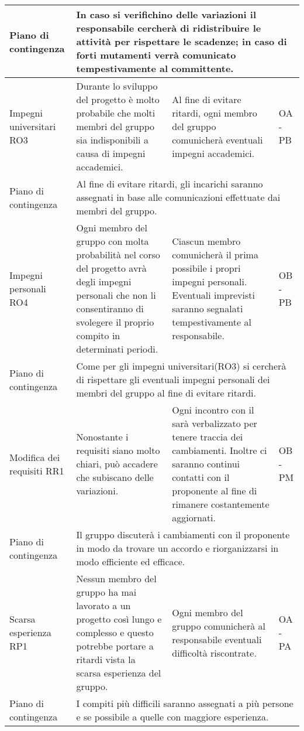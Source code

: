 \begin{center}
\begin{longtable}{|p{}|p{}|p{}|p{}|}
		\hline
		\centering Piano di contingenza & \multicolumn{3}{p{0.84\textwidth}}{In caso si verifichino delle variazioni il responsabile cercherà di ridistribuire le attività per rispettare le scadenze; in caso di forti mutamenti verrà comunicato tempestivamente al committente.  } \\
		\hline
		\centering Impegni universitari RO3& Durante lo sviluppo del progetto è molto probabile che molti membri del gruppo sia indisponibili a causa di impegni accademici.  &Al fine di evitare ritardi, ogni membro del gruppo comunicherà eventuali impegni accademici. & OA - PB \\
		\hline 
		\centering Piano di contingenza & \multicolumn{3}{p{0.84\textwidth}}{Al fine di evitare ritardi, gli incarichi saranno assegnati in base alle comunicazioni effettuate dai membri del gruppo.} \\
		\hline
		\centering Impegni personali RO4& Ogni membro del gruppo con molta probabilità nel corso del progetto avrà degli impegni personali che non li consentiranno di svolegere il proprio compito in determinati periodi. & Ciascun membro comunicherà il prima possibile i propri impegni personali. Eventuali imprevisti saranno segnalati tempestivamente al responsabile. & OB - PB \\
		\hline
		\centering Piano di contingenza & \multicolumn{3}{p{0.84\textwidth}}{Come per gli impegni universitari(RO3) si cercherà di rispettare gli eventuali impegni personali dei membri del gruppo al fine di evitare ritardi.} \\
		\hline
		\centering Modifica dei requisiti RR1& Nonostante i requisiti siano molto chiari, può accadere che subiscano delle variazioni.  & Ogni incontro con il \glock{proponente} sarà verbalizzato per tenere traccia dei cambiamenti. Inoltre ci saranno continui contatti con il proponente al fine di rimanere costantemente aggiornati. & OB - PM \\
		\hline
		\centering Piano di contingenza & \multicolumn{3}{p{0.84\textwidth}}{Il gruppo discuterà i cambiamenti con il proponente in modo da trovare un accordo e riorganizzarsi in modo efficiente ed efficace.} \\
		\hline
		\centering Scarsa esperienza RP1& Nessun membro del gruppo ha mai lavorato a un progetto così lungo e complesso e questo potrebbe portare a ritardi vista la scarsa esperienza del gruppo. & Ogni membro del gruppo comunicherà al responsabile eventuali difficoltà riscontrate. & OA - PA \\
		\hline
		\centering Piano di contingenza & \multicolumn{3}{p{0.84\textwidth}}{I compiti più difficili saranno assegnati a più persone e se possibile a quelle con maggiore esperienza.} \\

\end{longtable}
\end{center}
